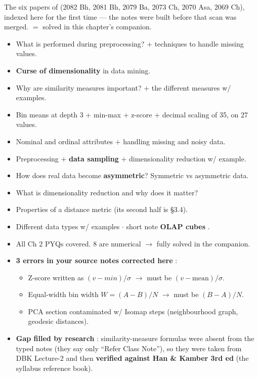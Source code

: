 {\color{sub}\footnotesize The six papers of  (2082 Bh, 2081 Bh, 2079 Ba, 2073 Ch, 2070 Asa, 2069 Ch), indexed here for the
first time --- the notes were built before that scan was merged.  $=$ solved in this chapter's companion. \added}
\begin{itemize}
  \item What is performed during preprocessing? $+$ techniques to handle missing values. \hfill {} 
  \item \textbf{Curse of dimensionality} in data mining. \hfill {} 
  \item Why are similarity measures important? $+$ the different measures w/ examples. \hfill {} 
  \item {} Bin means at depth 3 $+$ min-max $+$ z-score $+$ decimal scaling of 35, on 27 values. \hfill {} 
  \item Nominal and ordinal attributes $+$ handling missing and noisy data. \hfill {} 
  \item Preprocessing $+$ \textbf{data sampling} $+$ dimensionality reduction w/ example. \hfill {} 
  \item How does real data become \textbf{asymmetric}? Symmetric vs asymmetric data. \hfill {} 
  \item What is dimensionality reduction and why does it matter? \hfill {} 
  \item Properties of a distance metric \gap (its second half is \S3.4). \hfill {} 
  \item Different data types w/ examples  $\cdot$ short note \textbf{OLAP cubes} . \hfill {}
\end{itemize}

\begin{itemize}
  \item All Ch 2 PYQs covered. 8 are numerical $\rightarrow$ fully solved in the companion.
  \item \textbf{3 errors in your source notes corrected here} \added:
  \begin{itemize}
    \item Z-score written as $(v-min)/\sigma$ $\rightarrow$ must be $(v-\text{mean})/\sigma$.
    \item Equal-width bin width $W=(A-B)/N$ $\rightarrow$ must be $(B-A)/N$.
    \item PCA section contaminated w/ Isomap steps (neighbourhood graph, geodesic distances).
  \end{itemize}
  \item \textbf{Gap filled by research} \added: similarity-measure formulas were absent from the
        typed notes (they say only ``Refer Class Note''), so they were taken from DBK Lecture-2
        and then \textbf{verified against Han \& Kamber 3rd ed} (the syllabus reference book).
\end{itemize}

